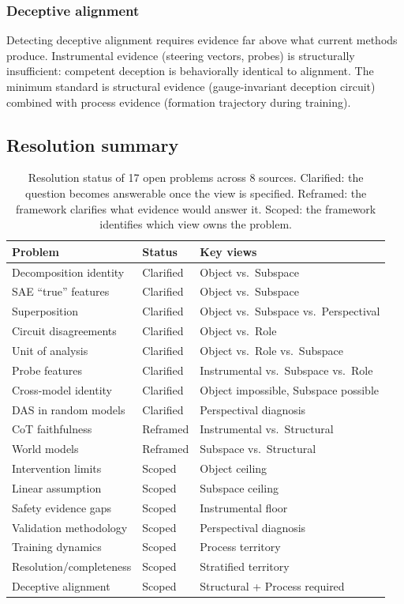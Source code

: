 \documentclass{article}
\begin{document}
\subsubsection{Deceptive alignment}
Detecting deceptive alignment requires evidence far above what current
methods produce.  Instrumental evidence (steering vectors, probes) is
structurally insufficient: competent deception is behaviorally identical
to alignment.  The minimum standard is structural evidence
(gauge-invariant deception circuit) combined with process evidence
(formation trajectory during training).

\subsection{Resolution summary}

\begin{table}[H]
\centering
\footnotesize
\begin{tabular}{lll}
\toprule
\textbf{Problem} & \textbf{Status} & \textbf{Key views} \\
\midrule
Decomposition identity & Clarified & Object vs.\ Subspace \\
SAE ``true'' features & Clarified & Object vs.\ Subspace \\
Superposition & Clarified & Object vs.\ Subspace vs.\ Perspectival \\
Circuit disagreements & Clarified & Object vs.\ Role \\
Unit of analysis & Clarified & Object vs.\ Role vs.\ Subspace \\
Probe features & Clarified & Instrumental vs.\ Subspace vs.\ Role \\
Cross-model identity & Clarified & Object impossible, Subspace possible \\
DAS in random models & Clarified & Perspectival diagnosis \\
CoT faithfulness & Reframed & Instrumental vs.\ Structural \\
World models & Reframed & Subspace vs.\ Structural \\
Intervention limits & Scoped & Object ceiling \\
Linear assumption & Scoped & Subspace ceiling \\
Safety evidence gaps & Scoped & Instrumental floor \\
Validation methodology & Scoped & Perspectival diagnosis \\
Training dynamics & Scoped & Process territory \\
Resolution/completeness & Scoped & Stratified territory \\
Deceptive alignment & Scoped & Structural + Process required \\
\bottomrule
\end{tabular}
\caption{Resolution status of 17 open problems across 8 sources.
Clarified: the question becomes answerable once the view is specified. Reframed:
the framework clarifies what evidence would answer it. Scoped: the
framework identifies which view owns the problem.}
\label{tab:openprobs}
\end{table}
\end{document}

